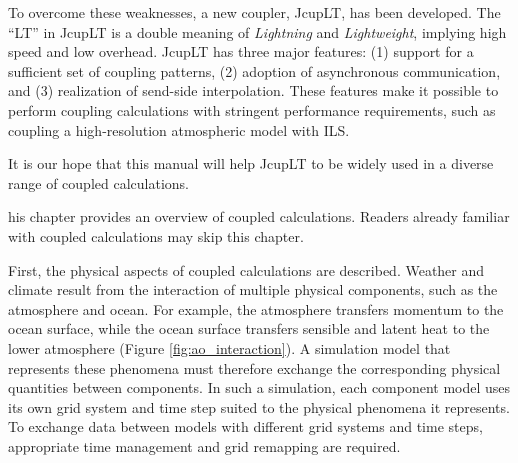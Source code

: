 \documentclass[11pt,a4paper]{report}
\newcommand{\figref}[1]{Figure \ref{#1}}
\begin{document}
To overcome these weaknesses,
a new coupler, JcupLT, has been developed.
The ``LT'' in JcupLT is a double meaning
of \emph{Lightning} and \emph{Lightweight},
implying high speed and low overhead.
JcupLT has three major features:
(1) support for a sufficient set of coupling patterns,
(2) adoption of asynchronous communication,
and (3) realization of send-side interpolation.
These features make it possible to perform
coupling calculations with stringent performance requirements,
such as coupling a high-resolution atmospheric model with ILS.

It is our hope that this manual will help JcupLT
to be widely used
in a diverse range of coupled calculations.

\begingroup
\renewcommand{\chapter}[2]{}  %

%

\endgroup


\chapter{Introduction to Coupled Calculations}

This chapter provides an overview of coupled calculations.
Readers already familiar with coupled calculations may skip this chapter.

First, the physical aspects of coupled calculations are described.
Weather and climate result from the interaction of multiple physical components,
such as the atmosphere and ocean.
For example, the atmosphere transfers momentum to the ocean surface,
while the ocean surface transfers sensible and latent heat
to the lower atmosphere (\figref{fig:ao_interaction}).
A simulation model that represents these phenomena
must therefore exchange the corresponding physical quantities between components.
In such a simulation, each component model uses its own grid system and time step
suited to the physical phenomena it represents.
To exchange data between models with different grid systems and time steps,
appropriate time management and grid remapping are required.
\end{document}
